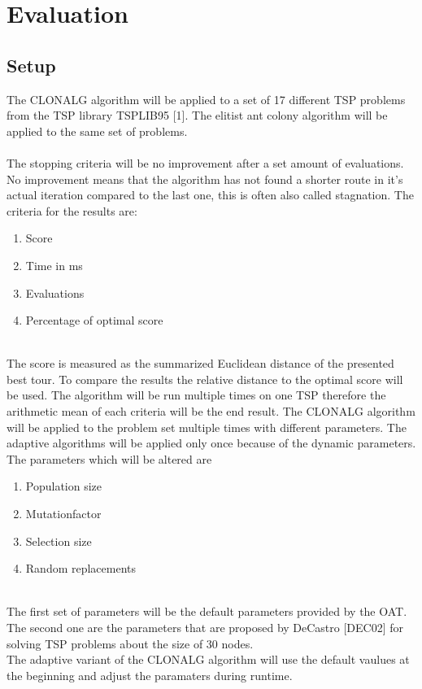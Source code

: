 \chapter{Evaluation}
\label{chap:eva}
\section{Setup}
The CLONALG algorithm will be applied to a set of 17 different TSP problems from the TSP library TSPLIB95 [1]. The elitist ant colony algorithm will be applied to the same set of problems.\\\\ 
The stopping criteria will be no improvement after a set amount of evaluations. No improvement means that the algorithm has not found a shorter route in it's actual iteration compared to the last one, this is often also called stagnation. 
The criteria for the results are:
\begin{enumerate}
	\item 	Score
	\item 	Time in ms
	\item 	Evaluations	
	\item  	Percentage of optimal score
\end{enumerate}\\
The score is measured as the summarized Euclidean distance of the presented best tour. To compare the results the relative distance to the optimal score will be used. The algorithm will be run multiple times on one TSP therefore the arithmetic mean of each criteria will be the end result. The CLONALG algorithm will be applied to the problem set multiple times with different parameters. The adaptive algorithms will be applied only once because of the dynamic parameters.
The parameters which will be altered are
\begin{enumerate}
	\item 	Population size
	\item 	Mutationfactor
	\item 	Selection size
	\item 	Random replacements	
\end{enumerate}\\
The first set of parameters will be the default parameters provided by the OAT. The second one are the parameters that are proposed by DeCastro [DEC02] for solving TSP problems about the size of 30 nodes.\\
The adaptive variant of the CLONALG algorithm will use the default vaulues at the beginning and adjust the paramaters during runtime.\\
